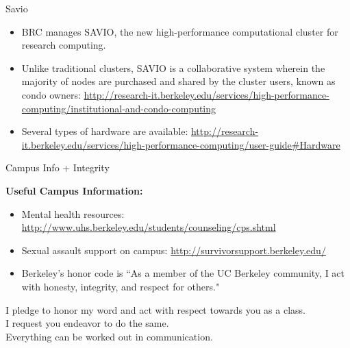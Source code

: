\documentclass[xcolor=x11names,compress]{beamer}
\renewcommand{\(}{\begin{columns}}
\renewcommand{\)}{\end{columns}}
\newcommand{\<}[1]{\begin{column}{#1}}
\renewcommand{\>}{\end{column}}
\begin{document}
\begin{frame}{Savio}

\begin{itemize}
\item BRC manages SAVIO, the new high-performance computational
cluster for research computing.	

\item Unlike traditional clusters, SAVIO is a collaborative system
wherein the majority of nodes are purchased and shared by the cluster users, known as condo owners: \href{http://research-it.berkeley.edu/services/high-performance-
computing/institutional-and-condo-computing}{http://research-it.berkeley.edu/services/high-performance-
computing/institutional-and-condo-computing}		

\item Several types of hardware are available: \href{http://research-it.berkeley.edu/services/high-performance-computing/user-guide\#Hardware}{http://research-it.berkeley.edu/services/high-performance-computing/user-guide\#Hardware}	
\end{itemize}

\end{frame}


\begin{frame}{Campus Info + Integrity}

\textbf{Useful Campus Information:} 
\begin{itemize}
  \item Mental health resources: \href{http://www.uhs.berkeley.edu/students/counseling/cps.shtml}{http://www.uhs.berkeley.edu/students/counseling/cps.shtml}
  \item Sexual assault support on campus: \href{http://survivorsupport.berkeley.edu/}{http://survivorsupport.berkeley.edu/}
  \item Berkeley’s honor code is ``As a member of the UC Berkeley community, I act with honesty, integrity, and respect for others."
\end{itemize}

\vspace*{1 em}
I pledge to honor my word and act with respect towards you as a class. \\
I request you endeavor to do the same.\\ 
Everything can be worked out in communication. 

\end{frame}
\end{document}
